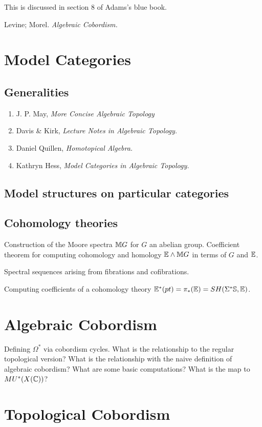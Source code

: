 \documentclass{article}%
\begin{document}
This is discussed in section 8 of Adams's blue book.

Levine; Morel. {\it Algebraic Cobordism.}


\section{Model Categories}
\subsection{Generalities}

\begin{enumerate}
\item J. P. May, {\it More Concise Algebraic Topology}
\item Davis \& Kirk, {\it Lecture Notes in Algebraic Topology.}
\item Daniel Quillen, {\it Homotopical Algebra.}
\item Kathryn Hess, {\it Model Categories in Algebraic Topology.}
\end{enumerate}

\subsection{Model structures on particular categories}

\subsection{Cohomology theories}

Construction of the Moore spectra $\mathbb{M} G$ for $G$ an abelian
group. Coefficient theorem for computing cohomology and homology $\mathbb{E}
\wedge \mathbb{M} G$ in terms of $G$ and $\mathbb{E}$. 

Spectral sequences arising from fibrations and cofibrations.

Computing coefficients of a cohomology theory $\mathbb{E}^*(pt) =
\pi_*(\mathbb{E})=SH(\Sigma^*\mathbb{S},\mathbb{E})$. 

\section{Algebraic Cobordism}
Defining $\Omega^*$ via cobordism cycles. What is the relationship to
the regular topological version? What is the relationship with the
naive definition of algebraic cobordism? What are some basic
computations? What is the map to $MU^*(X(\mathbb{C}))$? 

\section{Topological Cobordism}
\end{document}
